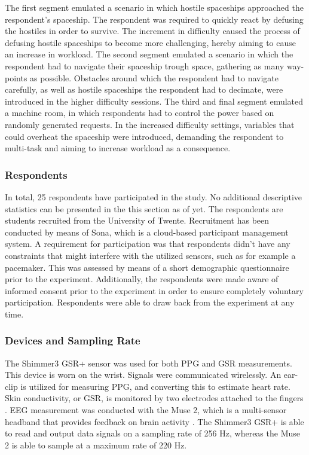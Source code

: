 \documentclass[12pt]{article}
\begin{document}
The first segment emulated a scenario in which hostile spaceships approached the respondent's spaceship. The respondent was required to quickly react by defusing the hostiles in order to survive. The increment in difficulty caused the process of defusing hostile spaceships to become more challenging, hereby aiming to cause an increase in workload. The second segment emulated a scenario in which the respondent had to navigate their spaceship trough space, gathering as many way-points as possible. Obstacles around which the respondent had to navigate carefully, as well as hostile spaceships the respondent had to decimate, were introduced in the higher difficulty sessions. The third and final segment emulated a machine room, in which respondents had to control the power based on randomly generated requests. In the increased difficulty settings, variables that could overheat the spaceship were introduced, demanding the respondent to multi-task and aiming to increase workload as a consequence.

\subsubsection{Respondents}
In total, 25 respondents have participated in the study. No additional descriptive statistics can be presented in the this section as of yet. The respondents are students recruited from the University of Twente. Recruitment has been conducted by means of Sona, which is a cloud-based participant management system. A requirement for participation was that respondents didn't have any constraints that might interfere with the utilized sensors, such as for example a pacemaker. This was assessed by means of a short demographic questionnaire prior to the experiment. Additionally, the respondents were made aware of informed consent prior to the experiment in order to ensure completely voluntary participation. Respondents were able to draw back from the experiment at any time. 

\subsubsection{Devices and Sampling Rate}
The Shimmer3 GSR+ sensor was used for both PPG and GSR measurements. This device is worn on the wrist. Signals were communicated wirelessly. An ear-clip is utilized for measuring PPG, and converting this to estimate heart rate. Skin conductivity, or GSR, is monitored by two electrodes attached to the fingers \cite{shimmer}. EEG measurement was conducted with the Muse 2, which is a multi-sensor headband that provides feedback on brain activity \cite{muse}. The Shimmer3 GSR+ is able to read and output data signals on a sampling rate of 256 Hz, whereas the Muse 2 is able to sample at a maximum rate of 220 Hz. 
\end{document}
